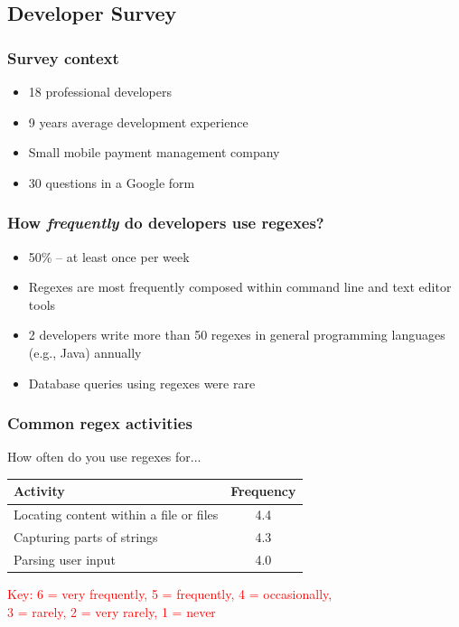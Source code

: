 \subsection{Developer Survey}

\begin{frame}
\frametitle{Survey context}

\begin{itemize}
	\item 18 professional developers 
	\item 9 years average development experience
	\item Small mobile payment management company
	\item 30 questions in a Google form
\end{itemize}
\end{frame}

\begin{frame}
\frametitle{How \emph{frequently} do developers use regexes?}

\begin{itemize}
	\item 50\%  -- at least once per week
	\item Regexes are most frequently composed within command line and text editor tools
	\item 2 developers write more than 50 regexes in general programming languages (e.g., Java) annually
	\item Database queries using regexes were rare
\end{itemize}
\end{frame}


\begin{frame}
\frametitle{Common regex activities}

\begin{block}{How often do you use regexes for... }

\begin{center}
\begin{tabular}{l|c}
\toprule
\textbf{Activity} & \textbf{Frequency} \\  \hline 
Locating content within a file or files & 4.4\\ \hline 
Capturing parts of strings & 4.3 \\ \hline 
Parsing user input & 4.0\\  
\bottomrule
\end{tabular}
\end{center}
\end{block}
\textcolor{red}{Key: 6 = very frequently, 5 = frequently, 4 = occasionally, \\3 = rarely, 2 = very rarely, 1 = never}

\end{frame}


